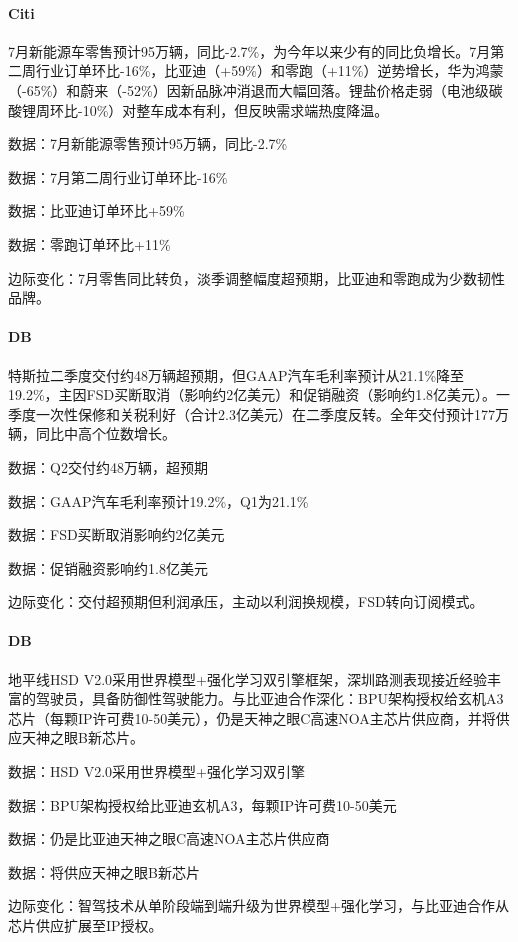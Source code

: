 \documentclass[11pt]{ctexart}
\begin{document}
\paragraph{Citi} 7月新能源车零售预计95万辆，同比-2.7\%，为今年以来少有的同比负增长。7月第二周行业订单环比-16\%，比亚迪（+59\%）和零跑（+11\%）逆势增长，华为鸿蒙（-65\%）和蔚来（-52\%）因新品脉冲消退而大幅回落。锂盐价格走弱（电池级碳酸锂周环比-10\%）对整车成本有利，但反映需求端热度降温。
{\small\color{refgray}数据：7月新能源零售预计95万辆，同比-2.7\%\par}
{\small\color{refgray}数据：7月第二周行业订单环比-16\%\par}
{\small\color{refgray}数据：比亚迪订单环比+59\%\par}
{\small\color{refgray}数据：零跑订单环比+11\%\par}
{\small\color{refgray}边际变化：7月零售同比转负，淡季调整幅度超预期，比亚迪和零跑成为少数韧性品牌。\par}
\paragraph{DB} 特斯拉二季度交付约48万辆超预期，但GAAP汽车毛利率预计从21.1\%降至19.2\%，主因FSD买断取消（影响约2亿美元）和促销融资（影响约1.8亿美元）。一季度一次性保修和关税利好（合计2.3亿美元）在二季度反转。全年交付预计177万辆，同比中高个位数增长。
{\small\color{refgray}数据：Q2交付约48万辆，超预期\par}
{\small\color{refgray}数据：GAAP汽车毛利率预计19.2\%，Q1为21.1\%\par}
{\small\color{refgray}数据：FSD买断取消影响约2亿美元\par}
{\small\color{refgray}数据：促销融资影响约1.8亿美元\par}
{\small\color{refgray}边际变化：交付超预期但利润承压，主动以利润换规模，FSD转向订阅模式。\par}
\paragraph{DB} 地平线HSD V2.0采用世界模型+强化学习双引擎框架，深圳路测表现接近经验丰富的驾驶员，具备防御性驾驶能力。与比亚迪合作深化：BPU架构授权给玄机A3芯片（每颗IP许可费10-50美元），仍是天神之眼C高速NOA主芯片供应商，并将供应天神之眼B新芯片。
{\small\color{refgray}数据：HSD V2.0采用世界模型+强化学习双引擎\par}
{\small\color{refgray}数据：BPU架构授权给比亚迪玄机A3，每颗IP许可费10-50美元\par}
{\small\color{refgray}数据：仍是比亚迪天神之眼C高速NOA主芯片供应商\par}
{\small\color{refgray}数据：将供应天神之眼B新芯片\par}
{\small\color{refgray}边际变化：智驾技术从单阶段端到端升级为世界模型+强化学习，与比亚迪合作从芯片供应扩展至IP授权。\par}
\end{document}
